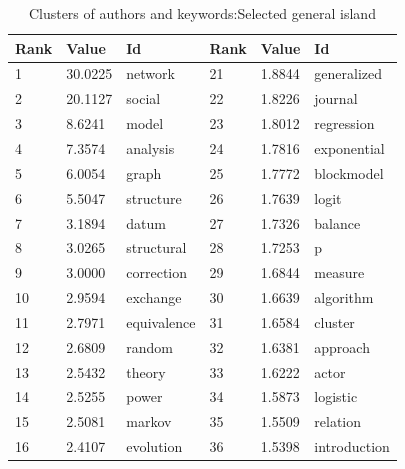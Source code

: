 \documentclass[11pt]{article} %
\begin{document}
\begin{table}
\begin{center}
\caption{Clusters of authors and keywords:\label{akwgi} Selected general island} \medskip 
\begin{tabular}{p{0.7cm}|p{1.3cm}|p{2.1cm}||p{0.7cm}|p{1.3cm}|p{2.1cm}} \\ \hline \hline 
      Rank     &     Value  & Id			&      	    Rank   &   Value &  Id	    	   \\ \hline 
         1     &   30.0225  & network		&            21     &  1.8844 &  generalized  		   \\
         2     &   20.1127  & social		&            22     &  1.8226 &  journal  		   \\
         3     &    8.6241  & model		&            23     &  1.8012 &  regression  		   \\
         4     &    7.3574  & analysis		&            24     &  1.7816 &  exponential  		   \\
         5     &    6.0054  & graph		&            25     &  1.7772 &  blockmodel  		   \\
         6     &    5.5047  & structure		&            26     &  1.7639 &  logit  		   \\
         7     &    3.1894  & datum		&            27     &  1.7326 &  balance  		   \\
         8     &    3.0265  & structural		&            28     &  1.7253 &  p  		   \\
         9     &    3.0000  & correction		&            29     &  1.6844 &  measure  	   \\
        10     &    2.9594  & exchange		&            30     &  1.6639 &  algorithm  		   \\
        11     &    2.7971  & equivalence		&            31     &  1.6584 &  cluster  	   \\
        12     &    2.6809  & random		&            32     &  1.6381 &  approach  		   \\
        13     &    2.5432  & theory		&            33     &  1.6222 &  actor  		   \\
        14     &    2.5255  & power		&            34     &  1.5873 &  logistic  		   \\
        15     &    2.5081  & markov		&            35     &  1.5509 &  relation  		   \\
        16     &    2.4107  & evolution		&            36     &  1.5398 &  introduction  		   \\

\end{tabular}
\end{center}
\end{table}
\end{document}
